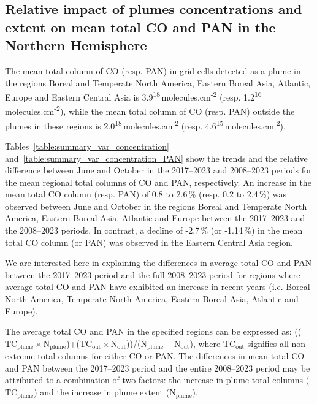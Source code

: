 \documentclass[acp, manuscript]{copernicus}
\begin{document}
\subsection{Relative impact of plumes concentrations and extent on mean total CO and PAN in the Northern Hemisphere}{\label{variability_chap4}}


The mean total column of CO (resp. PAN) in grid cells detected as a plume in the regions Boreal and Temperate North America, Eastern Boreal Asia, Atlantic, Europe and Eastern Central Asia is 3.9\textsuperscript{18}\,molecules.cm\textsuperscript{-2} (resp. 1.2\textsuperscript{16}\,molecules.cm\textsuperscript{-2}), while the mean total column of CO (resp. PAN) outside the plumes in these regions is 2.0\textsuperscript{18}\,molecules.cm\textsuperscript{-2} (resp. 4.6\textsuperscript{15}\,molecules.cm\textsuperscript{-2}). 


Tables~\ref{table:summary_var_concentration} and~\ref{table:summary_var_concentration_PAN} show the trends and the relative difference between June and October in the 2017--2023 and 2008--2023 periods for the mean regional total columns of CO and PAN, respectively. An increase in the mean total CO column (resp. PAN) of 0.8 to 2.6\,\% (resp. 0.2 to 2.4\,\%) was observed between June and October in the regions Boreal and Temperate North America, Eastern Boreal Asia, Atlantic and Europe between the 2017--2023 and the 2008--2023 periods. In contrast, a decline of -2.7\,\% (or -1.14\,\%) in the mean total CO column (or PAN) was observed in the Eastern Central Asia region.


We are interested here in explaining the differences in average total CO and PAN between the 2017--2023 period and the full 2008--2023 period for regions where average total CO and PAN have exhibited an increase in recent years (i.e. Boreal North America, Temperate North America, Eastern Boreal Asia, Atlantic and Europe). 


The average total CO and PAN in the specified regions can be expressed as: 
(($\text{TC}_{\text{plume}} \times \text{N}_{\text{plume}}$)+($\text{TC}_{\text{out}} \times \text{N}_{\text{out}}$))/($\text{N}_{\text{plume}} + \text{N}_{\text{out}}$), where $\text{TC}_{\text{out}}$ signifies all non-extreme total columns for either CO or PAN.  
The differences in mean total CO and PAN between the 2017--2023 period and the entire 2008--2023 period may be attributed to a combination of two factors: the increase in plume total columns ($\text{TC}_{\text{plume}}$) and the increase in plume extent ($\text{N}_{\text{plume}}$).
\end{document}
